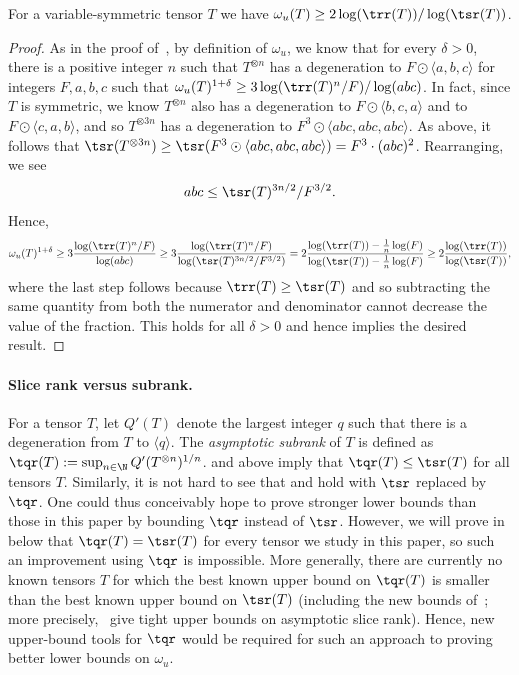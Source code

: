 \documentclass{toc}
\begin{document}
\begin{theorem}\label{thm:symmSOmega}
For a variable-symmetric tensor $T$ we have $\omega_u(T) \geq 2 \log (\trr(T)) / \log(\tsr(T)) $.
\end{theorem}

\begin{proof}
As in the proof of~\cite[Theorem~4.1]{aw}, by definition of $\omega_u$, we know that for every $\delta>0$, there is a positive integer $n$ such that $T^{\otimes n}$ has a degeneration to $F \odot \langle a,b,c \rangle$ for integers $F,a,b,c$ such that $\omega_u(T)^{1+\delta} \geq 3 \log(\trr(T)^n / F) / \log(abc)$. In fact, since $T$ is symmetric, we know $T^{\otimes n}$ also has a degeneration to $F \odot \langle b,c,a \rangle$ and to $F \odot \langle c,a,b \rangle$, and so $T^{\otimes 3n}$ has a degeneration to $F^3 \odot \langle abc, abc, abc \rangle$. As above, it follows that $\tsr(T^{\otimes 3n}) \geq \tsr(F^3 \odot \langle abc, abc, abc \rangle) = F^3 \cdot (abc)^2$. Rearranging, we see
$$abc \leq \tsr(T)^{3n/2} / F^{3/2}.$$
Hence,
$$\omega_u(T)^{1+\delta} \geq 3 \frac{\log(\trr(T)^n / F) }{ \log(abc)} \geq 3 \frac{\log(\trr(T)^n / F) }{ \log(\tsr(T)^{3n/2} / F^{3/2})} = 2 \frac{\log(\trr(T)) - \frac{1}{n} \log(F) }{ \log(\tsr(T)) - \frac{1}{n}\log(F)} \geq 2 \frac{\log(\trr(T)) }{ \log(\tsr(T)) },$$
where the last step follows because $\trr(T) \geq \tsr(T)$ and so subtracting the same quantity from both the numerator and denominator cannot decrease the value of the fraction. This holds for all $\delta>0$ and hence implies the desired result.
\end{proof}

%
\paragraph{Slice rank versus subrank.} For a tensor $T$, let $Q'(T)$ denote the largest integer $q$ such that there is a degeneration from $T$ to $\langle q \rangle$. The \emph{asymptotic subrank} of $T$ is defined as $\tqr(T) := \sup_{n \in \N} Q'(T^{\otimes n})^{1/n}$.  and  above imply that $\tqr(T) \leq \tsr(T)$ for all tensors $T$. Similarly, it is not hard to see that  and  hold with $\tsr$ replaced by $\tqr$. One could thus conceivably hope to prove stronger lower bounds than those in this paper by bounding $\tqr$ instead of $\tsr$. However, we will prove in  below that $\tqr(T) = \tsr(T)$ for every tensor we study in this paper, so such an improvement using $\tqr$ is impossible. More generally, there are currently no known tensors $T$ for which the best known upper bound on $\tqr(T)$ is smaller than the best known upper bound on $\tsr(T)$ (including the new bounds of~\cite{quantum,theirpreprint}; more precisely,~\cite{quantum} give tight upper bounds on asymptotic slice rank). Hence,
%
new  %
%
upper-bound tools for  %
$\tqr$ would be required for such an approach to proving better lower bounds on $\omega_u$.
\end{document}
